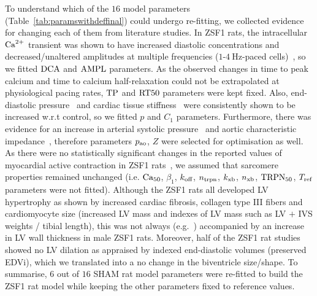 \vspace{0.2cm}
To understand which of the $16$ model parameters (Table~\ref{tab:paramswithdeffinal}) could undergo re-fitting, we collected evidence for changing each of them from literature studies. In ZSF1 rats, the intracellular $\textrm{Ca}^{2+}$ transient was shown to have increased diastolic concentrations and decreased/unaltered amplitudes at multiple frequencies ($1$-$\SI{4}{\Hz}$-paced cells)~\cite{Miranda-Silva:2020, Abdellatif:2021}, so we fitted $\textrm{DCA}$ and $\textrm{AMPL}$ parameters. As the observed changes in time to peak calcium and time to calcium half-relaxation could not be extrapolated at physiological pacing rates, $\textrm{TP}$ and $\textrm{RT50}$ parameters were kept fixed. Also, end-diastolic pressure~\cite{Abdellatif:2016, Bowen:2017, Hamdani:2013, Hohendanner:2018, Lai:2016, Leite:2015, Leite:2015*a, Leite:2019, Salah:2018, Schmederer:2018} and cardiac tissue stiffness~\cite{Hamdani:2013, Abdellatif:2016, Van-Dijk:2016, Salah:2018, Schmederer:2018, Leite:2019, Davila:2019, Nguyen:2020} were consistently shown to be increased w.r.t control, so we fitted $p$ and $C_1$ parameters. Furthermore, there was evidence for an increase in arterial systolic pressure~\cite{Cuijpers:2020} and aortic characteristic impedance~\cite{Leite:2019}, therefore parameters $p_{\textrm{ao}}$, $Z$ were selected for optimisation as well. As there were no statistically significant changes in the reported values of myocardial active contraction in ZSF1 rats~\cite{Deel:2017, McCain:2014, Hersch:2013}, we assumed that sarcomere properties remained unchanged (i.e. $\textrm{Ca}_{50}$, $\beta_1$, $k_{\textrm{off}}$, $n_{\textrm{trpn}}$, $k_{\textrm{xb}}$, $n_{\textrm{xb}}$, $\textrm{TRPN}_{50}$, $T_{\textrm{ref}}$ parameters were not fitted). Although the ZSF1 rats all developed LV hypertrophy as shown by increased cardiac fibrosis, collagen type III fibers and cardiomyocyte size (increased LV mass and indexes of LV mass such as LV $+$ IVS weights / tibial length), this was not always (e.g.~\cite{Van-Dijk:2016, Schmederer:2018}) accompanied by an increase in LV wall thickness in male ZSF1 rats. Moreover, half of the ZSF1 rat studies~\cite{Hamdani:2013, Leite:2015, Leite:2015*a, Leite:2019, Abdellatif:2016, Lai:2016, Van-Dijk:2016, Nguyen:2020} showed no LV dilation as appraised by indexed end-diastolic volumes (preserved EDVi), which we translated into a no change in the biventricle size/shape. To summarise, $6$ out of $16$ SHAM rat model parameters were re-fitted to build the ZSF1 rat model while keeping the other parameters fixed to reference values.


